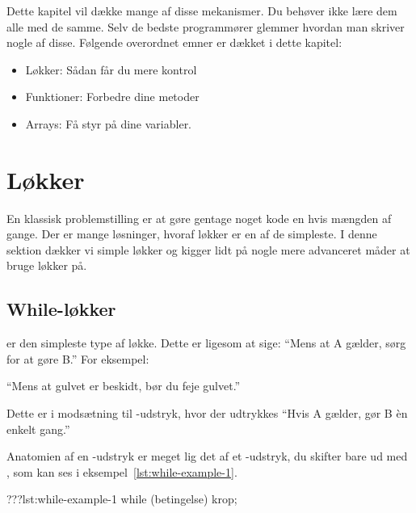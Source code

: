 
    Dette kapitel vil dække mange af disse mekanismer. Du behøver ikke
    lære dem alle med de samme. Selv de bedste programmører glemmer
    hvordan man skriver nogle af disse. Følgende overordnet emner er
    dækket i dette kapitel:

	\begin{itemize} %
		\item Løkker: Sådan får du mere kontrol
		\item Funktioner: Forbedre dine metoder
		\item Arrays: Få styr på dine variabler.
	\end{itemize}

\section{Løkker}

    En klassisk problemstilling er at gøre gentage noget kode en hvis
    mængden af gange. Der er mange løsninger, hvoraf løkker er en af
    de simpleste. I denne sektion dækker vi simple løkker og kigger
    lidt på nogle mere advanceret måder at bruge løkker på.

	\subsection{While-løkker}

         er den simpleste type af løkke. Dette er ligesom at
		sige: ``Mens at A gælder, sørg for at gøre B.'' For eksempel:

		``Mens at gulvet er beskidt, bør du feje gulvet.''

		Dette er i modsætning til -udstryk, hvor der udtrykkes
		``Hvis A gælder, gør B èn enkelt gang.''



		Anatomien af en -udstryk er meget lig det af et
		-udstryk, du skifter bare  ud med
		, som kan ses i eksempel~\ref{lst:while-example-1}.

		\begin{JavaCode}{???}{lst:while-example-1}
			while (betingelse) {
				krop;
			}
		\end{JavaCode}

